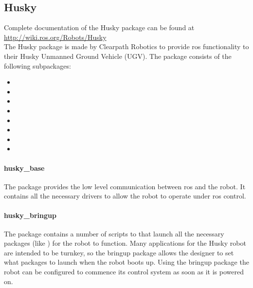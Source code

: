 \subsection{Husky}

Complete documentation of the Husky package can be found at \url{http://wiki.ros.org/Robots/Husky}\\

The Husky package is made by Clearpath Robotics to provide \acrshort{ros} functionality to their Husky Unmanned Ground Vehicle (UGV). The package consists of the following subpackages:

\begin{itemize}
    \item {}
    \item {}
    \item {}
    \item {}
    \item {}
    \item {}
    \item {}
    \item {}
\end{itemize}

\paragraph{husky\_base}

The  package provides the low level communication between \acrshort{ros} and the robot. It contains all the necessary drivers to allow the robot to operate under \acrshort{ros} control.\\

\paragraph{husky\_bringup}

The  package contains a number of scripts to that launch all the necessary packages (like ) for the robot to function. Many applications for the Husky robot are intended to be turnkey, so the bringup package allows the designer to set what packages to launch when the robot boots up. Using the bringup package the robot can be configured to commence its control system as soon as it is powered on.\\

